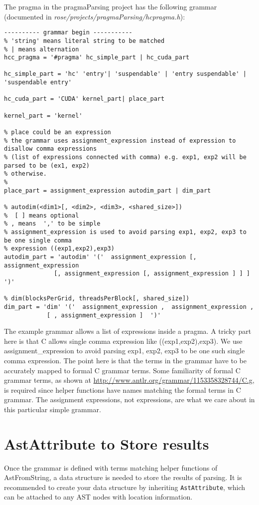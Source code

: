 The pragma in the pragmaParsing project has the following grammar (documented in \textit{rose/projects/pragmaParsing/hcpragma.h}):
\begin{verbatim}
---------- grammar begin -----------
% 'string' means literal string to be matched
% | means alternation
hcc_pragma = '#pragma' hc_simple_part | hc_cuda_part

hc_simple_part = 'hc' 'entry'| 'suspendable' | 'entry suspendable' | 'suspendable entry'

hc_cuda_part = 'CUDA' kernel_part| place_part

kernel_part = 'kernel'

% place could be an expression
% the grammar uses assignment_expression instead of expression to disallow comma expressions
% (list of expressions connected with comma) e.g. exp1, exp2 will be parsed to be (ex1, exp2) 
% otherwise.
% 
place_part = assignment_expression autodim_part | dim_part

% autodim(<dim1>[, <dim2>, <dim3>, <shared_size>])
%  [ ] means optional
% , means  ',' to be simple
% assignment_expression is used to avoid parsing exp1, exp2, exp3 to be one single comma 
% expression ((exp1,exp2),exp3)
autodim_part = 'autodim' '('  assignment_expression [, assignment_expression 
              [, assignment_expression [, assignment_expression ] ] ]  ')'

% dim(blocksPerGrid, threadsPerBlock[, shared_size])
dim_part = 'dim' '('  assignment_expression ,  assignment_expression ,  
            [ , assignment_expression ]  ')'

\end{verbatim}
The example grammar allows a list of expressions inside a pragma. 
A tricky part here is that C allows single comma expression like ((exp1,exp2),exp3).
We use  assignment\_expression  to avoid parsing exp1, exp2, exp3 to be one such single comma  expression. 
The point here is that the terms in the grammar have to be accurately mapped to formal C grammar terms.  
Some familiarity of formal C grammar terms, as shown at \url{http://www.antlr.org/grammar/1153358328744/C.g}, is required since helper functions have names matching the formal terms in C grammar. 
The assignment expressions, not expressions,  are what we care about in this particular simple grammar. 

\section{AstAttribute to Store results}
Once the grammar is defined with terms matching helper functions of AstFromString, a data structure is needed to store the results of parsing. 
It is recommended to create your data structure by inheriting \lstinline{AstAttribute}, which can be attached to any AST nodes with location information.


